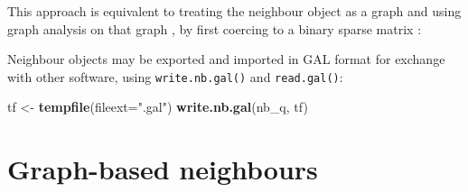 \documentclass[]{book}
\newenvironment{Shaded}{\begin{snugshade}}{\end{snugshade}}
\newcommand{\CommentTok}[1]{\textcolor[rgb]{0.56,0.35,0.01}{\textit{#1}}}
\newcommand{\DataTypeTok}[1]{\textcolor[rgb]{0.13,0.29,0.53}{#1}}
\newcommand{\KeywordTok}[1]{\textcolor[rgb]{0.13,0.29,0.53}{\textbf{#1}}}
\newcommand{\NormalTok}[1]{#1}
\newcommand{\OperatorTok}[1]{\textcolor[rgb]{0.81,0.36,0.00}{\textbf{#1}}}
\newcommand{\OtherTok}[1]{\textcolor[rgb]{0.56,0.35,0.01}{#1}}
\newcommand{\StringTok}[1]{\textcolor[rgb]{0.31,0.60,0.02}{#1}}
\begin{document}
\begin{Shaded}
\end{Shaded}

This approach is equivalent to treating the neighbour object as a graph and using graph analysis on that graph \citep{csardi+nepusz:06, R-igraph}, by first coercing to a binary sparse matrix \citep{R-Matrix}:

\begin{Shaded}
\end{Shaded}

Neighbour objects may be exported and imported in GAL format for exchange with other software, using \texttt{write.nb.gal()} and \texttt{read.gal()}:

\begin{Shaded}
\begin{Highlighting}[]
\NormalTok{tf <-}\StringTok{ }\KeywordTok{tempfile}\NormalTok{(}\DataTypeTok{fileext=}\StringTok{".gal"}\NormalTok{)}
\KeywordTok{write.nb.gal}\NormalTok{(nb_q, tf)}
\end{Highlighting}
\end{Shaded}

\hypertarget{graph-based-neighbours}{%
\section{Graph-based neighbours}\label{graph-based-neighbours}}
\end{document}
